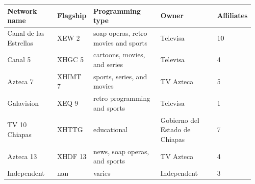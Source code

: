 \documentclass{article}
\begin{document}
\begin{tabular}{lllll}
\toprule
Network name & Flagship & Programming type & Owner & Affiliates \\
\midrule
Canal de las Estrellas & XEW 2 & soap operas, retro movies and sports & Televisa & 10 \\
Canal 5 & XHGC 5 & cartoons, movies, and series & Televisa & 4 \\
Azteca 7 & XHIMT 7 & sports, series, and movies & TV Azteca & 5 \\
Galavision & XEQ 9 & retro programming and sports & Televisa & 1 \\
TV 10 Chiapas & XHTTG & educational & Gobierno del Estado de Chiapas & 7 \\
Azteca 13 & XHDF 13 & news, soap operas, and sports & TV Azteca & 4 \\
Independent & nan & varies & Independent & 3 \\
\bottomrule
\end{tabular}
\end{document}
